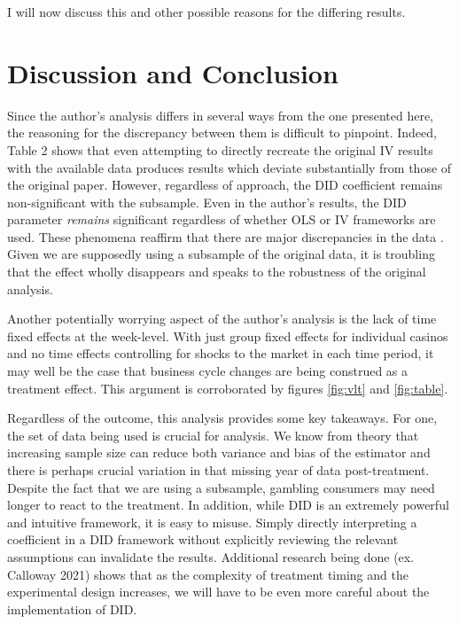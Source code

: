 \documentclass{article}
\begin{document}
I will now discuss this and other possible reasons for the differing results.


\section*{Discussion and Conclusion}

Since the author's analysis differs in several ways from the one presented here, the reasoning for the discrepancy between them is difficult to pinpoint. Indeed, Table 2 shows that even attempting to directly recreate the original IV results with the available data produces results which deviate substantially from those of the original paper. However, regardless of approach, the DID coefficient remains non-significant with the subsample. Even in the author's results, the DID parameter \textit{remains} significant regardless of whether OLS or IV frameworks are used. These phenomena reaffirm that there are major discrepancies in the data . Given we are supposedly using a subsample of the original data, it is troubling that the effect wholly disappears and speaks to the robustness of the original analysis.

Another potentially worrying aspect of the author's analysis is the lack of time fixed effects at the week-level. With just group fixed effects for individual casinos and no time effects controlling for shocks to the market in each time period, it may well be the case that business cycle changes are being construed as a treatment effect. This argument is corroborated by figures \ref{fig:vlt} and \ref{fig:table}.

Regardless of the outcome, this analysis provides some key takeaways. For one, the set of data being used is crucial for analysis. We know from theory that increasing sample size can reduce both variance and bias of the estimator and there is perhaps crucial variation in that missing year of data post-treatment. Despite the fact that we are using a subsample, gambling consumers may need longer to react to the treatment. In addition, while DID is an extremely powerful and intuitive framework, it is easy to misuse. Simply directly interpreting a coefficient in a DID framework without explicitly reviewing the relevant assumptions can invalidate the results. Additional research being done (ex. Calloway 2021\cite{Callaway2021}) shows that as the complexity of treatment timing and the experimental design increases, we will have to be even more careful about the implementation of DID.
\end{document}

